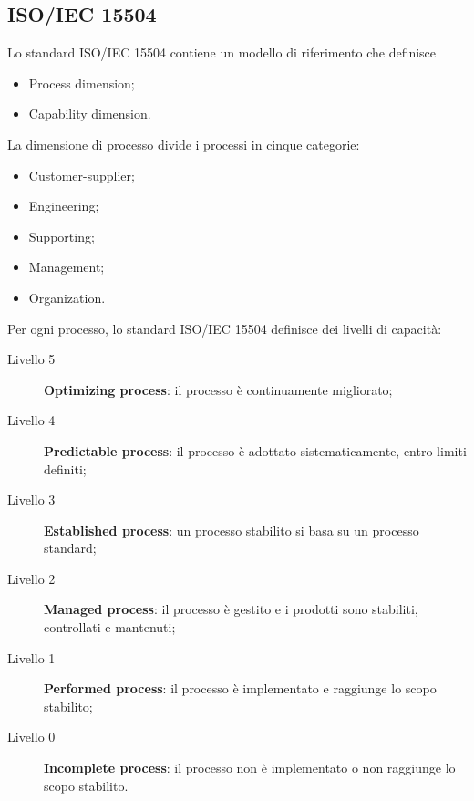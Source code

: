 \documentclass[PianoDiQualifica.tex]{subfiles}
\begin{document}
\begin{appendices}
\chapter{ISO/IEC 15504}
Lo standard ISO/IEC 15504 contiene un modello di riferimento che definisce 
\begin{itemize}
	\item Process dimension;
	\item Capability dimension.
\end{itemize}

La dimensione di processo divide i processi in cinque categorie:
\begin{itemize}
	\item Customer-supplier;
	\item Engineering;
	\item Supporting;
	\item Management;
	\item Organization.
\end{itemize}

Per ogni processo, lo standard ISO/IEC 15504 definisce dei livelli di capacità:
\begin{description}
	\item [\normalfont Livello 5] \textbf{Optimizing process}: il processo è continuamente migliorato;
	\item [\normalfont Livello 4] \textbf{Predictable process}: il processo è adottato sistematicamente, entro limiti definiti;
	\item [\normalfont Livello 3] \textbf{Established process}: un processo stabilito si basa su un processo standard;
	\item [\normalfont Livello 2] \textbf{Managed process}: il processo è gestito e i prodotti sono stabiliti, controllati e mantenuti;
	\item [\normalfont Livello 1] \textbf{Performed process}: il processo è implementato e raggiunge lo scopo stabilito;
	\item [\normalfont Livello 0] \textbf{Incomplete process}: il processo non è implementato o non raggiunge lo scopo stabilito.\\
\end{description}


\end{appendices}
\end{document}
